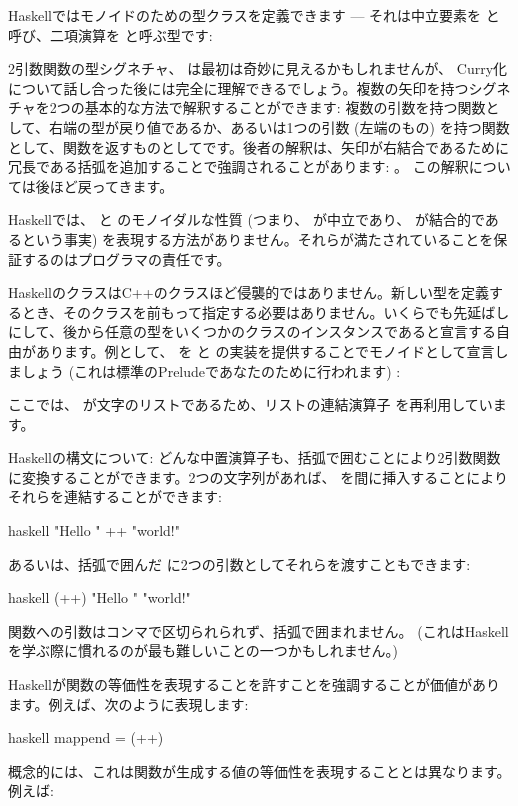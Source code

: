 Haskellではモノイドのための型クラスを定義できます --- それは中立要素を  と呼び、二項演算を  と呼ぶ型です: 

2引数関数の型シグネチャ、
 は最初は奇妙に見えるかもしれませんが、
Curry化について話し合った後には完全に理解できるでしょう。複数の矢印を持つシグネチャを2つの基本的な方法で解釈することができます: 複数の引数を持つ関数として、右端の型が戻り値であるか、あるいは1つの引数 (左端のもの) を持つ関数として、関数を返すものとしてです。後者の解釈は、矢印が右結合であるために冗長である括弧を追加することで強調されることがあります: 。
この解釈については後ほど戻ってきます。

Haskellでは、 と  のモノイダルな性質 (つまり、 が中立であり、 が結合的であるという事実) を表現する方法がありません。それらが満たされていることを保証するのはプログラマの責任です。

HaskellのクラスはC++のクラスほど侵襲的ではありません。新しい型を定義するとき、そのクラスを前もって指定する必要はありません。いくらでも先延ばしにして、後から任意の型をいくつかのクラスのインスタンスであると宣言する自由があります。例として、 を  と  の実装を提供することでモノイドとして宣言しましょう (これは標準のPreludeであなたのために行われます) : 

ここでは、 が文字のリストであるため、リストの連結演算子 \code{(++)} を再利用しています。

Haskellの構文について: どんな中置演算子も、括弧で囲むことにより2引数関数に変換することができます。2つの文字列があれば、\code{++} を間に挿入することによりそれらを連結することができます: 

\begin{snip}{haskell}
"Hello " ++ "world!"
\end{snip}
あるいは、括弧で囲んだ \code{(++)} に2つの引数としてそれらを渡すこともできます: 

\begin{snip}{haskell}
(++) "Hello " "world!"
\end{snip}
関数への引数はコンマで区切られられず、括弧で囲まれません。 (これはHaskellを学ぶ際に慣れるのが最も難しいことの一つかもしれません。) 

Haskellが関数の等価性を表現することを許すことを強調することが価値があります。例えば、次のように表現します: 

\begin{snip}{haskell}
mappend = (++)
\end{snip}
概念的には、これは関数が生成する値の等価性を表現することとは異なります。例えば: 

